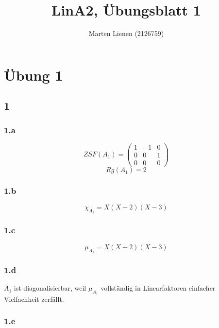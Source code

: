 \documentclass[10pt,a4paper]{article}
\title{LinA2, Übungsblatt 1}
\author{Marten Lienen (2126759)}
\begin{document}
\maketitle

\section*{Übung 1}

\subsection*{1}

\subsubsection*{1.a}

\begin{equation}
ZSF(A_{1}) = 
\begin{pmatrix}
1 & -1 & 0\\
0 & 0 & 1\\
0 & 0 & 0
\end{pmatrix}
\end{equation}
\begin{equation}
Rg(A_{1}) = 2
\end{equation}

\subsubsection*{1.b}

\begin{equation}
\chi_{A_{1}} = X(X-2)(X-3)
\end{equation}

\subsubsection*{1.c}

\begin{equation}
\mu_{A_{1}} = X(X-2)(X-3)
\end{equation}

\subsubsection*{1.d}

$A_{1}$ ist diagonalisierbar, weil $\mu_{A_{1}}$ vollständig in Linearfaktoren einfacher Vielfachheit zerfällt.

\subsubsection*{1.e}
\end{document}
